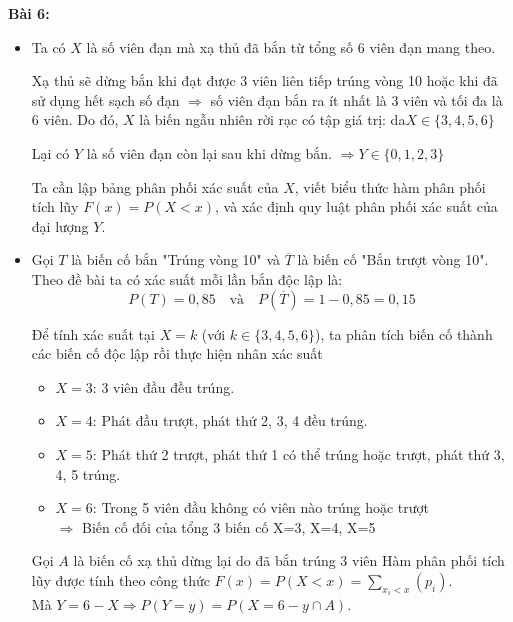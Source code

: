 \documentclass[12pt]{article}
\begin{document}
\textbf{Bài 6:}
\begin{itemize}
    \item Ta có $X$ là số viên đạn mà xạ thủ đã bắn từ tổng số 6 viên đạn mang theo.
    
    Xạ thủ sẽ dừng bắn khi đạt được 3 viên liên tiếp trúng vòng 10 hoặc khi đã sử dụng hết sạch số đạn $\Rightarrow$ số viên đạn bắn ra ít nhất là 3 viên và tối đa là 6 viên. Do đó, $X$ là biến ngẫu nhiên rời rạc có tập giá trị: da$X \in \{3, 4, 5, 6\}$
    
    Lại có $Y$ là số viên đạn còn lại sau khi dừng bắn. $\Rightarrow Y \in \{0, 1, 2, 3\} $
    
    Ta cần lập bảng phân phối xác suất của $X$, viết biểu thức hàm phân phối tích lũy $\displaystyle F(x) = P(X < x)$, và xác định quy luật phân phối xác suất của đại lượng $Y$.

    \item Gọi $T$ là biến cố bắn "Trúng vòng 10" và $\overline{T}$ là biến cố "Bắn trượt vòng 10". Theo đề bài ta có xác suất mỗi lần bắn độc lập là:
    \[ P(T) = 0,85 \quad \text{và} \quad P(\overline{T}) = 1 - 0,85 = 0,15 \]
    
    Để tính xác suất tại $X = k$ (với $k \in \{3, 4, 5, 6\}$), ta phân tích biến cố thành các biến cố độc lập rồi thực hiện nhân xác suất
    \begin{itemize}
        \item $X = 3$: 3 viên đầu đều trúng.
        \item $X = 4$: Phát đầu trượt, phát thứ 2, 3, 4 đều trúng.
        \item $X = 5$: Phát thứ 2 trượt, phát thứ 1 có thể trúng hoặc trượt, phát thứ 3, 4, 5 trúng.
        \item $X = 6$: Trong 5 viên đầu không có viên nào trúng hoặc trượt \\ $\Rightarrow$ Biến cố đối của tổng 3 biến cố X=3, X=4, X=5
    \end{itemize}
    Gọi $A$ là biến cố xạ thủ dừng lại do đã bắn trúng 3 viên
    Hàm phân phối tích lũy được tính theo công thức $\displaystyle F(x) = P(X < x) = \sum_{x_i < x} (p_i)$. \\ Mà $Y=6-X \Rightarrow \displaystyle P(Y = y) = P(X = 6 - y \cap A)$.

\clearpage


\end{itemize}
\end{document}
